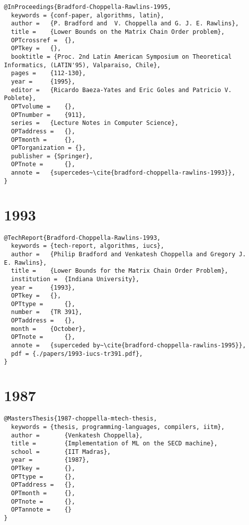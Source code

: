 \documentclass[11pt]{article}
\begin{document}
\begin{lstlisting}
@InProceedings{Bradford-Choppella-Rawlins-1995,
  keywords = {conf-paper, algorithms, latin},
  author = 	 {P. Bradford and  V. Choppella and G. J. E. Rawlins},
  title = 	 {Lower Bounds on the Matrix Chain Order problem},
  OPTcrossref =  {},
  OPTkey = 	 {},
  booktitle = {Proc. 2nd Latin American Symposium on Theoretical Informatics, (LATIN'95), Valparaiso, Chile},
  pages = 	 {112-130},
  year = 	 {1995},
  editor = 	 {Ricardo Baeza-Yates and Eric Goles and Patricio V. Poblete},
  OPTvolume = 	 {},
  OPTnumber = 	 {911},
  series = 	 {Lecture Notes in Computer Science},
  OPTaddress = 	 {},
  OPTmonth = 	 {},
  OPTorganization = {},
  publisher = {Springer},
  OPTnote = 	 {},
  annote = 	 {supercedes~\cite{bradford-choppella-rawlins-1993}},
}
\end{lstlisting}
\section{1993}
\label{sec:orga7eef74}
\lstset{language=bibtex,label= ,caption= ,captionpos=b,numbers=none}
\begin{lstlisting}
@TechReport{Bradford-Choppella-Rawlins-1993,
  keywords = {tech-report, algorithms, iucs},
  author = 	 {Philip Bradford and Venkatesh Choppella and Gregory J. E. Rawlins},
  title = 	 {Lower Bounds for the Matrix Chain Order Problem},
  institution =  {Indiana University},
  year = 	 {1993},
  OPTkey = 	 {},
  OPTtype = 	 {},
  number = 	 {TR 391},
  OPTaddress = 	 {},
  month = 	 {October},
  OPTnote = 	 {},
  annote = 	 {superceded by~\cite{bradford-choppella-rawlins-1995}},
  pdf = {./papers/1993-iucs-tr391.pdf},
}
\end{lstlisting}

\section{1987}
\label{sec:org1e3ba6a}
\lstset{language=bibtex,label= ,caption= ,captionpos=b,numbers=none}
\begin{lstlisting}
@MastersThesis{1987-choppella-mtech-thesis,
  keywords = {thesis, programming-languages, compilers, iitm},
  author = 		 {Venkatesh Choppella},
  title = 		 {Implementation of ML on the SECD machine},
  school = 		 {IIT Madras},
  year = 		 {1987},
  OPTkey = 		 {},
  OPTtype = 	 {},
  OPTaddress = 	 {},
  OPTmonth = 	 {},
  OPTnote = 	 {},
  OPTannote = 	 {}
}
\end{lstlisting}
\end{document}
